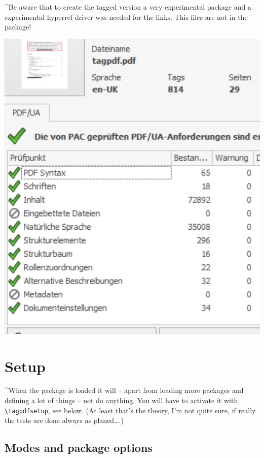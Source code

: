 \documentclass[DIV=12,parskip=half-,bibliography=totoc]{scrartcl}
\begin{document}
\begin{tcolorbox}
\TagP^Be aware that to create the tagged version a very experimental package and a experimental hyperref driver was needed for the links. This files are not in the package!\TagPend
\end{tcolorbox}

\includegraphics{pac3}
\tagmcend\tagstructend



\section{Setup}

\TagP^When the package is loaded it will -- apart from loading more packages and defining a lot of things -- not do anything. You will have to activate it with \verb+\tagpdfsetup+, see below. (At least that's the theory, I'm not quite sure, if really the tests are done always as planed\ldots.)
\TagPend


\subsection{Modes and package options}
\end{document}

